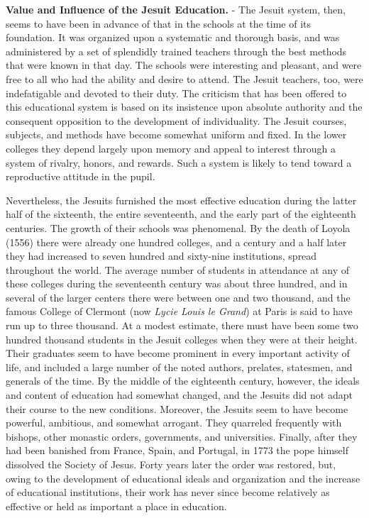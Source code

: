 \documentclass[]{book}
\begin{document}
\textbf{Value and Influence of the Jesuit Education.} - The Jesuit system, then, seems to have been in advance of that in the schools at the time of its foundation. It was organized upon a systematic and thorough basis, and was administered by a set of splendidly trained teachers through the best methods that were known in that day. The schools were interesting and pleasant, and were free to all who had the ability and desire to attend. The Jesuit teachers, too, were indefatigable and devoted to their duty. The criticism that has been offered to this educational system is based on its insistence upon absolute authority and the consequent opposition to the development of individuality. The Jesuit courses, subjects, and methods have become somewhat uniform and fixed. In the lower colleges they depend largely upon memory and appeal to interest through a system of rivalry, honors, and rewards. Such a system is likely to tend toward a reproductive attitude in the pupil.

Nevertheless, the Jesuits furnished the most effective education during the latter half of the sixteenth, the entire seventeenth, and the early part of the eighteenth centuries. The growth of their schools was phenomenal. By the death of Loyola (1556) there were already one hundred colleges, and a century and a half later they had increased to seven hundred and sixty-nine institutions, spread throughout the world. The average number of students in attendance at any of these colleges during the seventeenth century was about three hundred, and in several of the larger centers there were between one and two thousand, and the famous College of Clermont (now \emph{Lycie Louis le Grand}) at Paris is said to have run up to three thousand. At a modest estimate, there must have been some two hundred thousand students in the Jesuit colleges when they were at their height. Their graduates seem to have become prominent in every important activity of life, and included a large number of the noted authors, prelates, statesmen, and generals of the time. By the middle of the eighteenth century, however, the ideals and content of education had somewhat changed, and the Jesuits did not adapt their course to the new conditions. Moreover, the Jesuits seem to have become powerful, ambitious, and somewhat arrogant. They quarreled frequently with bishops, other monastic orders, governments, and universities. Finally, after they had been banished from France, Spain, and Portugal, in 1773 the pope himself dissolved the Society of Jesus. Forty years later the order was restored, but, owing to the development of educational ideals and organization and the increase of educational institutions, their work has never since become relatively as effective or held as important a place in education.
\end{document}
